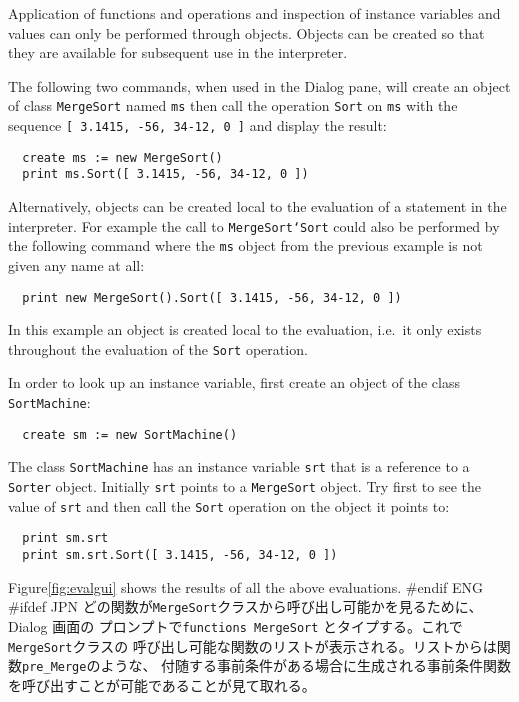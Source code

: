 \documentclass[\pformat,12pt]{article}
\newcommand{\aaa}{\tt }
\newcommand{\cmd}{\tt }
\newcommand{\guicmd}[1]{{\sf #1}}
\newcommand{\guicmd}[1]{{\gt #1}}
\begin{document}
Application of functions and operations and inspection of instance
variables and values can only be performed through objects.  Objects
can be created so that they are available for subsequent use in the
interpreter.

The following two commands, when used in the \guicmd{Dialog} pane, will
create an object of class {\aaa MergeSort} named {\aaa ms} then call
the operation {\tt Sort} on {\tt ms} with the sequence {\tt [ 3.1415,
  -56, 34-12, 0 ]} and display the result:

\begin{verbatim}
  create ms := new MergeSort()
  print ms.Sort([ 3.1415, -56, 34-12, 0 ])
\end{verbatim}

Alternatively, objects can 
be created local to the evaluation of a statement in the interpreter.
 For example the call to {\tt MergeSort`Sort}
could also be performed by the following command where the {\tt ms}
object from the previous example is not given any name at all:

\begin{verbatim}
  print new MergeSort().Sort([ 3.1415, -56, 34-12, 0 ])
\end{verbatim}

In this example an object is created local to the evaluation, i.e.\ 
it only exists throughout the evaluation of the {\tt Sort} operation.

In order to look up an instance variable, first create an object of
the class {\tt SortMachine}:

\begin{verbatim}
  create sm := new SortMachine()
\end{verbatim}

The class {\tt SortMachine} has an instance variable {\tt srt} that is
a reference to a {\tt Sorter} object.  Initially {\tt srt} points
to a {\tt MergeSort} object.  Try first to see the value of {\tt srt}
and then call the {\tt Sort} operation on the object it points to:

\begin{verbatim}
  print sm.srt
  print sm.srt.Sort([ 3.1415, -56, 34-12, 0 ])
\end{verbatim}

Figure\ref{fig:evalgui} shows the results of all the above
evaluations.
#endif ENG
#ifdef JPN
どの関数が{\aaa MergeSort}クラスから呼び出し可能かを見るために、\guicmd{Dialog} 画面の
プロンプトで{\cmd functions MergeSort} とタイプする。これで{\aaa MergeSort}クラスの
呼び出し可能な関数のリストが表示される。リストからは関数{\aaa pre\_Merge}のような、
付随する事前条件がある場合に生成される事前条件関数
を呼び出すことが可能であることが見て取れる。
\end{document}
